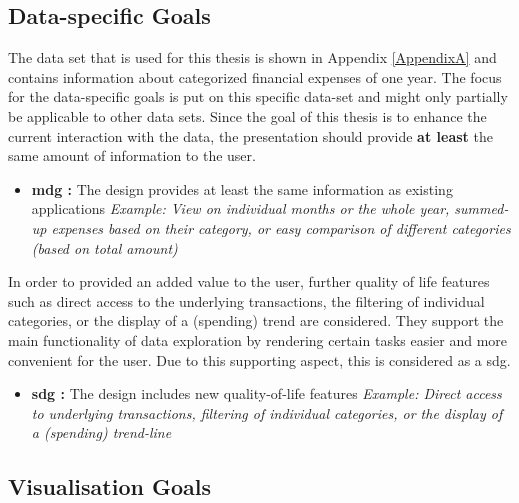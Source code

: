 
\subsection{Data-specific Goals}

The data set that is used for this thesis is shown in Appendix \ref{AppendixA} and contains information about categorized financial expenses of one year. The focus for the data-specific goals is put on this specific data-set and might only partially be applicable to other data sets. Since the goal of this thesis is to enhance the current interaction with the data, the presentation should provide \textbf{at least} the same amount of information to the user.
\begin{itemize}[noitemsep,nolistsep]
	\item \textbf{\gls{mdg} :} The design provides at least the same information as existing applications \newline
		\textit{Example: View on individual months or the whole year, summed-up expenses based on their category, or easy comparison of different categories (based on total amount)}
\end{itemize}
In order to provided an added value to the user, further quality of life features such as direct access to the underlying transactions, the filtering of individual categories, or the display of a (spending) trend are considered. They support the main functionality of data exploration by rendering certain tasks easier and more convenient for the user. Due to this supporting aspect, this is considered as a \gls{sdg}.
\begin{itemize}[noitemsep,nolistsep]
	\item \textbf{\gls{sdg} :} The design includes new quality-of-life features \newline
	\textit{Example: Direct access to underlying transactions, filtering of individual categories, or the display of a (spending) trend-line}
\end{itemize}



\subsection{Visualisation Goals}

